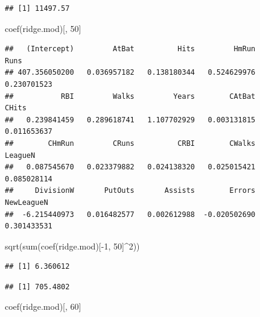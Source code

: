 \documentclass[
  12pt,
]{book}
\newenvironment{Shaded}{\begin{snugshade}}{\end{snugshade}}
\newcommand{\DecValTok}[1]{\textcolor[rgb]{0.00,0.00,0.81}{#1}}
\newcommand{\FunctionTok}[1]{\textcolor[rgb]{0.00,0.00,0.00}{#1}}
\newcommand{\NormalTok}[1]{#1}
\newcommand{\SpecialCharTok}[1]{\textcolor[rgb]{0.00,0.00,0.00}{#1}}
\theoremstyle{definition}
\theoremstyle{definition}
\theoremstyle{definition}
\theoremstyle{remark}
\begin{document}
\begin{verbatim}
## [1] 11497.57
\end{verbatim}

\begin{Shaded}
\begin{Highlighting}[]
\FunctionTok{coef}\NormalTok{(ridge.mod)[, }\DecValTok{50}\NormalTok{]}
\end{Highlighting}
\end{Shaded}

\begin{verbatim}
##   (Intercept)         AtBat          Hits         HmRun          Runs 
## 407.356050200   0.036957182   0.138180344   0.524629976   0.230701523 
##           RBI         Walks         Years        CAtBat         CHits 
##   0.239841459   0.289618741   1.107702929   0.003131815   0.011653637 
##        CHmRun         CRuns          CRBI        CWalks       LeagueN 
##   0.087545670   0.023379882   0.024138320   0.025015421   0.085028114 
##     DivisionW       PutOuts       Assists        Errors    NewLeagueN 
##  -6.215440973   0.016482577   0.002612988  -0.020502690   0.301433531
\end{verbatim}

\begin{Shaded}
\begin{Highlighting}[]
\FunctionTok{sqrt}\NormalTok{(}\FunctionTok{sum}\NormalTok{(}\FunctionTok{coef}\NormalTok{(ridge.mod)[}\SpecialCharTok{{-}}\DecValTok{1}\NormalTok{, }\DecValTok{50}\NormalTok{]}\SpecialCharTok{\^{}}\DecValTok{2}\NormalTok{))}
\end{Highlighting}
\end{Shaded}

\begin{verbatim}
## [1] 6.360612
\end{verbatim}

\begin{Shaded}
\end{Shaded}

\begin{verbatim}
## [1] 705.4802
\end{verbatim}

\begin{Shaded}
\begin{Highlighting}[]
\FunctionTok{coef}\NormalTok{(ridge.mod)[, }\DecValTok{60}\NormalTok{]}
\end{Highlighting}
\end{Shaded}
\end{document}
